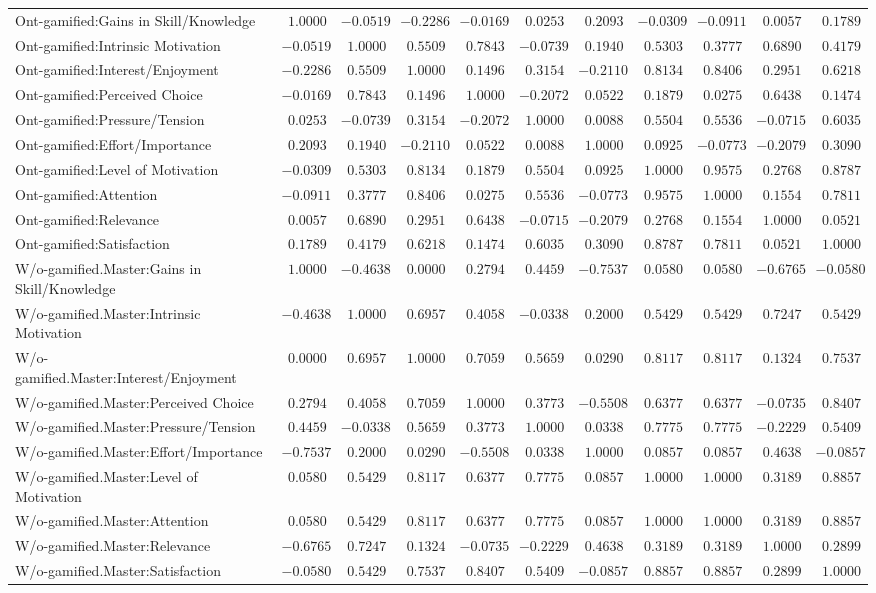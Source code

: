 \begin{landscape}
{\begin{longtable}{lrrrrrrrrrr}
Ont-gamified:Gains in Skill/Knowledge&$ 1.0000$&$-0.0519$&$-0.2286$&$-0.0169$&$ 0.0253$&$ 0.2093$&$-0.0309$&$-0.0911$&$ 0.0057$&$0.1789$\tabularnewline
Ont-gamified:Intrinsic Motivation&$-0.0519$&$ 1.0000$&$ 0.5509$&$ 0.7843$&$-0.0739$&$ 0.1940$&$ 0.5303$&$ 0.3777$&$ 0.6890$&$0.4179$\tabularnewline
Ont-gamified:Interest/Enjoyment&$-0.2286$&$ 0.5509$&$ 1.0000$&$ 0.1496$&$ 0.3154$&$-0.2110$&$ 0.8134$&$ 0.8406$&$ 0.2951$&$0.6218$\tabularnewline
Ont-gamified:Perceived Choice&$-0.0169$&$ 0.7843$&$ 0.1496$&$ 1.0000$&$-0.2072$&$ 0.0522$&$ 0.1879$&$ 0.0275$&$ 0.6438$&$0.1474$\tabularnewline
Ont-gamified:Pressure/Tension&$ 0.0253$&$-0.0739$&$ 0.3154$&$-0.2072$&$ 1.0000$&$ 0.0088$&$ 0.5504$&$ 0.5536$&$-0.0715$&$0.6035$\tabularnewline
Ont-gamified:Effort/Importance&$ 0.2093$&$ 0.1940$&$-0.2110$&$ 0.0522$&$ 0.0088$&$ 1.0000$&$ 0.0925$&$-0.0773$&$-0.2079$&$0.3090$\tabularnewline
Ont-gamified:Level of Motivation&$-0.0309$&$ 0.5303$&$ 0.8134$&$ 0.1879$&$ 0.5504$&$ 0.0925$&$ 1.0000$&$ 0.9575$&$ 0.2768$&$0.8787$\tabularnewline
Ont-gamified:Attention&$-0.0911$&$ 0.3777$&$ 0.8406$&$ 0.0275$&$ 0.5536$&$-0.0773$&$ 0.9575$&$ 1.0000$&$ 0.1554$&$0.7811$\tabularnewline
Ont-gamified:Relevance&$ 0.0057$&$ 0.6890$&$ 0.2951$&$ 0.6438$&$-0.0715$&$-0.2079$&$ 0.2768$&$ 0.1554$&$ 1.0000$&$0.0521$\tabularnewline
Ont-gamified:Satisfaction&$ 0.1789$&$ 0.4179$&$ 0.6218$&$ 0.1474$&$ 0.6035$&$ 0.3090$&$ 0.8787$&$ 0.7811$&$ 0.0521$&$1.0000$\tabularnewline
\hline


W/o-gamified.Master:Gains in Skill/Knowledge&$ 1.0000$&$-0.4638$&$0.0000$&$ 0.2794$&$ 0.4459$&$-0.7537$&$0.0580$&$0.0580$&$-0.6765$&$-0.0580$\tabularnewline
W/o-gamified.Master:Intrinsic Motivation&$-0.4638$&$ 1.0000$&$0.6957$&$ 0.4058$&$-0.0338$&$ 0.2000$&$0.5429$&$0.5429$&$ 0.7247$&$ 0.5429$\tabularnewline
W/o-gamified.Master:Interest/Enjoyment&$ 0.0000$&$ 0.6957$&$1.0000$&$ 0.7059$&$ 0.5659$&$ 0.0290$&$0.8117$&$0.8117$&$ 0.1324$&$ 0.7537$\tabularnewline
W/o-gamified.Master:Perceived Choice&$ 0.2794$&$ 0.4058$&$0.7059$&$ 1.0000$&$ 0.3773$&$-0.5508$&$0.6377$&$0.6377$&$-0.0735$&$ 0.8407$\tabularnewline
W/o-gamified.Master:Pressure/Tension&$ 0.4459$&$-0.0338$&$0.5659$&$ 0.3773$&$ 1.0000$&$ 0.0338$&$0.7775$&$0.7775$&$-0.2229$&$ 0.5409$\tabularnewline
W/o-gamified.Master:Effort/Importance&$-0.7537$&$ 0.2000$&$0.0290$&$-0.5508$&$ 0.0338$&$ 1.0000$&$0.0857$&$0.0857$&$ 0.4638$&$-0.0857$\tabularnewline
W/o-gamified.Master:Level of Motivation&$ 0.0580$&$ 0.5429$&$0.8117$&$ 0.6377$&$ 0.7775$&$ 0.0857$&$1.0000$&$1.0000$&$ 0.3189$&$ 0.8857$\tabularnewline
W/o-gamified.Master:Attention&$ 0.0580$&$ 0.5429$&$0.8117$&$ 0.6377$&$ 0.7775$&$ 0.0857$&$1.0000$&$1.0000$&$ 0.3189$&$ 0.8857$\tabularnewline
W/o-gamified.Master:Relevance&$-0.6765$&$ 0.7247$&$0.1324$&$-0.0735$&$-0.2229$&$ 0.4638$&$0.3189$&$0.3189$&$ 1.0000$&$ 0.2899$\tabularnewline
W/o-gamified.Master:Satisfaction&$-0.0580$&$ 0.5429$&$0.7537$&$ 0.8407$&$ 0.5409$&$-0.0857$&$0.8857$&$0.8857$&$ 0.2899$&$ 1.0000$\tabularnewline
\hline


\end{longtable}}
\end{landscape}
